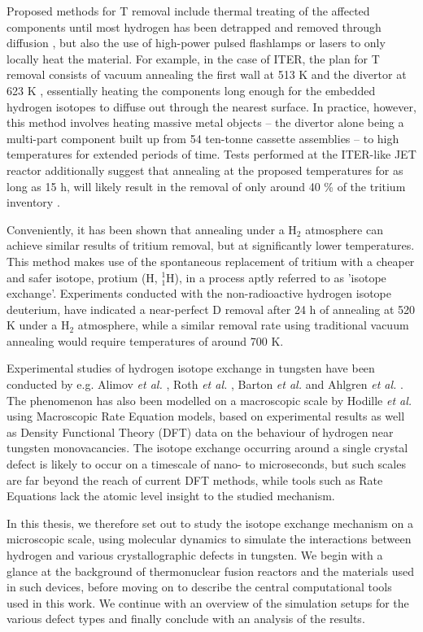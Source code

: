 Proposed methods for T removal include thermal treating of the affected components until most hydrogen has been detrapped and removed through diffusion \cite{heinola2017long}, but also the use of high-power pulsed flashlamps \cite{gibson2005removal} or lasers \cite{skinner2008recent,de2017efficiency} to only locally heat the material. 
For example, in the case of ITER, the plan for T removal consists of vacuum annealing the first wall at 513 K and the divertor at 623 K \cite{pitts2011physics}, essentially heating the components long enough for the embedded hydrogen isotopes to diffuse out through the nearest surface.
In practice, however, this method involves heating massive metal objects -- the divertor alone being a multi-part component built up from 54 ten-tonne cassette assemblies -- to high temperatures for extended periods of time. 
Tests performed at the ITER-like JET reactor additionally suggest that annealing at the proposed temperatures for as long as 15 h, will likely result in the removal of only around 40 \% of the tritium inventory \cite{heinola2017long}. 

Conveniently, it has been shown \cite{alimov2011hydrogen, roth2013hydrogen, barton2014deuterium} that annealing under a H$_2$ atmosphere can achieve similar results of tritium removal, but at significantly lower temperatures. 
This method makes use of the spontaneous replacement of tritium with a cheaper and safer isotope, protium (H, $^1_1$H), in a process aptly referred to as 'isotope exchange'. 
Experiments conducted with the non-radioactive hydrogen isotope deuterium, have indicated a near-perfect D removal after 24 h of annealing at 520 K under a H$_2$ atmosphere, while a similar removal rate using traditional vacuum annealing would require temperatures of around 700 K. \cite{ahlgren2019hydrogen}

Experimental studies of hydrogen isotope exchange in tungsten have been conducted by e.g. Alimov \textit{et al.} \cite{alimov2011hydrogen}, Roth \textit{et al.}  \cite{roth2013hydrogen}, Barton \textit{et al.} \cite{barton2014deuterium} and Ahlgren \textit{et al.} \cite{ahlgren2019hydrogen}. 
The phenomenon has also been modelled on a macroscopic scale by Hodille \textit{et al.} \cite{hodille2016study} using Macroscopic Rate Equation models, based on experimental results as well as Density Functional Theory (DFT) data on the behaviour of hydrogen near tungsten monovacancies. 
The isotope exchange occurring around a single crystal defect is likely to occur on a timescale of nano- to microseconds, but such scales are far beyond the reach of current DFT methods, while tools such as Rate Equations lack the atomic level insight to the studied mechanism.

In this thesis, we therefore set out to study the isotope exchange mechanism on a microscopic scale, using molecular dynamics to simulate the interactions between hydrogen and various crystallographic defects in tungsten.
We begin with a glance at the background of thermonuclear fusion reactors and the materials used in such devices, before moving on to describe the central computational tools used in this work. 
We continue with an overview of the simulation setups for the various defect types and finally conclude with an analysis of the results.


